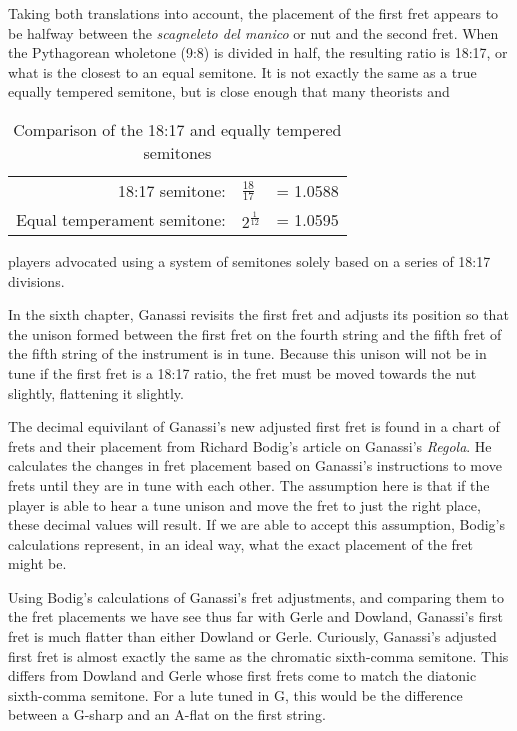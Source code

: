 Taking both translations into account, the placement of
the first fret appears to be halfway between the \textit{scagneleto del manico} or nut and the
second fret.  When the Pythagorean wholetone (9:8) is divided in half, the resulting ratio is
18:17, or what is the closest to an equal semitone.  It is not exactly the same
as a true equally tempered semitone, but is close enough that many theorists and
\begin{table}[h!]
    \begin{center}
    \begin{tabular}{ r l l }
        18:17 semitone:             & $ \frac{18}{17}  $ & = 1.0588 \\
        Equal temperament semitone: & $ 2^\frac{1}{12} $ & = 1.0595 \\
    \end{tabular}
    \end{center}
    \caption{Comparison of the 18:17 and equally tempered semitones}
\end{table}
players advocated using a system of semitones solely based on a series of 18:17
divisions.

In the sixth chapter, Ganassi revisits the first fret and adjusts
its position so that the unison formed between the first fret on the fourth string and the fifth fret
of the fifth string of the instrument is in tune.\autocite[67]{RB:3}  Because this unison will not be
in tune if the first fret is a 18:17 ratio, the fret must be moved towards the nut slightly, flattening
it slightly.

The decimal equivilant of Ganassi's new adjusted first fret is found in a chart of frets and
their placement from Richard Bodig's article on Ganassi's \textit{Regola}.  He calculates the
changes in fret placement based on Ganassi's instructions to move frets until they are in tune
with each other.  The assumption here is that if the player is able to hear a tune unison and
move the fret to just the right place, these decimal values will result.  If we are able to
accept this assumption, Bodig's calculations represent, in an ideal way, what the exact
placement of the fret might be.

Using Bodig's calculations of Ganassi's fret adjustments, and comparing them to the fret
placements we have see thus far with Gerle and Dowland, Ganassi's first fret is much flatter
than either Dowland or Gerle.  Curiously, Ganassi's adjusted first fret is almost exactly
the same as the chromatic sixth-comma semitone.  This differs from Dowland and Gerle whose
first frets come to match the diatonic sixth-comma semitone.  For a lute tuned in G,
this would be the difference between a G-sharp and an A-flat on the first string.


